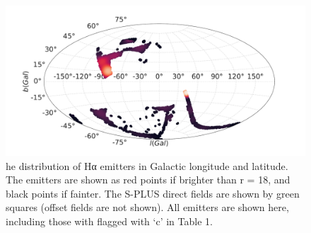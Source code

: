 \documentclass[fleqn,usenatbib]{mnras}
\begin{document}
\begin{figure}
\includegraphics[width=0.9\linewidth]{Figs/halpha-emitters-galactic-aitoff.pdf}
\centering
{}
\caption{he distribution of Hα emitters in Galactic longitude and latitude. The emitters are shown as red points if brighter than r = 18, and black points if
fainter. The S-PLUS direct fields are shown by green squares (offset fields are not shown). All emitters are shown here, including those with flagged with ‘c’ in
Table 1.}
\end{figure}
\end{document}
